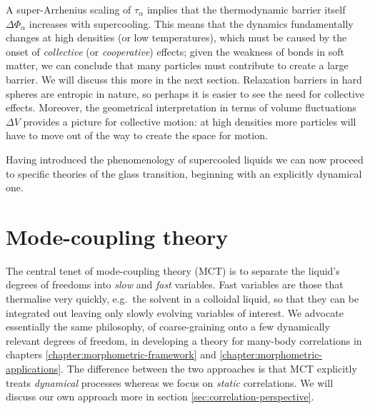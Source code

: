 \documentclass[11pt,twoside]{report}
\begin{document}
A super-Arrhenius scaling of $\tau_\alpha$ implies that the thermodynamic barrier itself $\Delta \Phi_\alpha$ increases with supercooling.
This means that the dynamics fundamentally changes at high densities (or low temperatures), which must be caused by the onset of \emph{collective} (or \emph{cooperative}) effects; given the weakness of bonds in soft matter, we can conclude that many particles must contribute to create a large barrier.
We will discuss this more in the next section.
Relaxation barriers in hard spheres are entropic in nature, so perhaps it is easier to see the need for collective effects.
Moreover, the geometrical interpretation in terms of volume fluctuations $\Delta V$ provides a picture for collective motion: at high densities more particles will have to move out of the way to create the space for motion.



Having introduced the phenomenology of supercooled liquids we can now proceed to specific theories of the glass transition, beginning with an explicitly dynamical one.

\section{Mode-coupling theory}
\label{sec:mct}

The central tenet of mode-coupling theory (MCT) is to separate the liquid's degrees of freedoms into \emph{slow} and \emph{fast} variables.
Fast variables are those that thermalise very quickly, e.g.\ the solvent in a colloidal liquid, so that they can be integrated out leaving only slowly evolving variables of interest.
We advocate essentially the same philosophy, of coarse-graining onto a few dynamically relevant degrees of freedom, in developing a theory for many-body correlations in chapters \ref{chapter:morphometric-framework} and \ref{chapter:morphometric-applications}.
The difference between the two approaches is that MCT explicitly treats \emph{dynamical} processes whereas we focus on \emph{static} correlations.
We will discuss our own approach more in section \ref{sec:correlation-perspective}.
\end{document}
